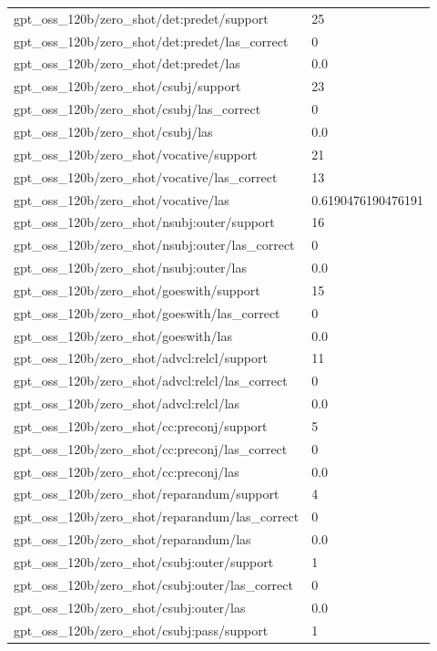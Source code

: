 \begin{tabular}{ll}
gpt\_oss\_120b/zero\_shot/det:predet/support & 25 \\
gpt\_oss\_120b/zero\_shot/det:predet/las\_correct & 0 \\
gpt\_oss\_120b/zero\_shot/det:predet/las & 0.0 \\
gpt\_oss\_120b/zero\_shot/csubj/support & 23 \\
gpt\_oss\_120b/zero\_shot/csubj/las\_correct & 0 \\
gpt\_oss\_120b/zero\_shot/csubj/las & 0.0 \\
gpt\_oss\_120b/zero\_shot/vocative/support & 21 \\
gpt\_oss\_120b/zero\_shot/vocative/las\_correct & 13 \\
gpt\_oss\_120b/zero\_shot/vocative/las & 0.6190476190476191 \\
gpt\_oss\_120b/zero\_shot/nsubj:outer/support & 16 \\
gpt\_oss\_120b/zero\_shot/nsubj:outer/las\_correct & 0 \\
gpt\_oss\_120b/zero\_shot/nsubj:outer/las & 0.0 \\
gpt\_oss\_120b/zero\_shot/goeswith/support & 15 \\
gpt\_oss\_120b/zero\_shot/goeswith/las\_correct & 0 \\
gpt\_oss\_120b/zero\_shot/goeswith/las & 0.0 \\
gpt\_oss\_120b/zero\_shot/advcl:relcl/support & 11 \\
gpt\_oss\_120b/zero\_shot/advcl:relcl/las\_correct & 0 \\
gpt\_oss\_120b/zero\_shot/advcl:relcl/las & 0.0 \\
gpt\_oss\_120b/zero\_shot/cc:preconj/support & 5 \\
gpt\_oss\_120b/zero\_shot/cc:preconj/las\_correct & 0 \\
gpt\_oss\_120b/zero\_shot/cc:preconj/las & 0.0 \\
gpt\_oss\_120b/zero\_shot/reparandum/support & 4 \\
gpt\_oss\_120b/zero\_shot/reparandum/las\_correct & 0 \\
gpt\_oss\_120b/zero\_shot/reparandum/las & 0.0 \\
gpt\_oss\_120b/zero\_shot/csubj:outer/support & 1 \\
gpt\_oss\_120b/zero\_shot/csubj:outer/las\_correct & 0 \\
gpt\_oss\_120b/zero\_shot/csubj:outer/las & 0.0 \\
gpt\_oss\_120b/zero\_shot/csubj:pass/support & 1 \\

\end{tabular}
